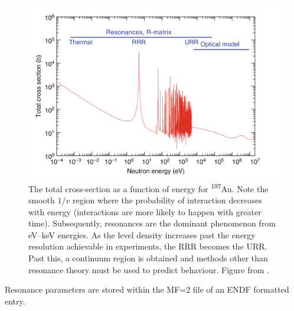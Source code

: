 
\begin{figure}[ht]
  \includegraphics[width=\textwidth]{au-197_sigma_tot}
  \caption{The total cross-section as a function of energy for \textsuperscript{197}Au. Note the smooth $1/v$ region where the probability of interaction decreases with energy (interactions are more likely to happen with greater time). Subsequently, resonances are the dominant phenomenon from eV--keV energies. As the level density increases past the energy resolution achievable in experiments, the RRR becomes the URR. Past this, a continuum region is obtained and methods other than resonance theory must be used to predict behaviour. Figure from \cite{Cacuci2010}.}
  \label{fig:au-197_sigma_tot}
\end{figure}

Resonance parameters are stored within the MF=2 file of an ENDF formatted entry. 

